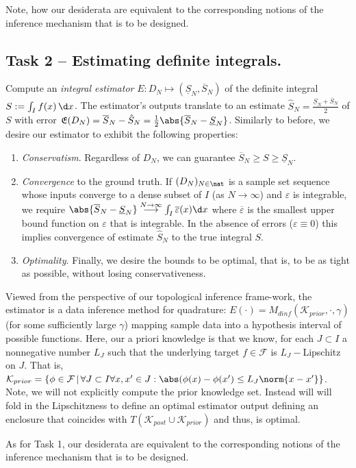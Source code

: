 Note, how our desiderata are equivalent to the corresponding notions of the inference mechanism that is to be designed.

\subsection{Task 2 -- Estimating definite integrals.}
	\label{sec:problemdef_task2}
 Compute an \textit{integral estimator} $E: D_N \mapsto (\underline S_N, \overline S_N)$ of the definite integral $S := \int_I f(x) \, \d x$. The estimator's outputs translate to an estimate $\hat S_N = \frac{\underline S_N+ \overline S_N}{2}$ of $S$ with error $\mathfrak E(D_N) =\overline S_N - \hat S_N = \frac{1}{2} \abs{\overline S_N - \underline S_N}$. Similarly to before, we desire our estimator to exhibit the following properties:
\begin{enumerate}
			\item \textit{Conservatism}.  Regardless of $D_N$, we can guarantee $\overline S_N \geq S \geq \underline S_N$. 
			
			\item \textit{Convergence} to the ground truth. If $(D_N)_{N \in \nat }$ is a sample set sequence whose inputs converge to a dense subset of $I$ (as $N \to \infty$) and $\varepsilon$ is integrable, we require $\abs{\overline S_N - \underline S_N} \stackrel{N \to \infty} \longrightarrow \int_I  \overline \varepsilon(x) \d x$ where $\overline \varepsilon$ is the smallest upper bound function on $\varepsilon$ that is integrable. In the absence of errors ($\varepsilon \equiv 0$) this implies convergence of estimate $\hat S_N$ to the true integral $S$.
			\item \textit{Optimality}. Finally, we desire the bounds to be optimal, that is, to be as tight as possible, without losing conservativeness.
\end{enumerate}

Viewed from the perspective of our topological inference frame-work, the estimator is a data inference method for quadrature:
$E(\cdot) = M_{dinf}(\mathcal K_{prior}, \cdot, \gamma ) $ (for some sufficiently large $\gamma$) mapping sample data into a hypothesis interval of possible functions. 
Here,  our a priori knowledge is that we know, for each $J \subset I$ a nonnegative number $L_J$ such that the underlying target $f \in \mathcal F$ is $L_J-$Lipschitz on $J$. That is, $\mathcal K_{prior} =\{\phi \in \mathcal F \,|\, \forall J \subset I \forall x,x' \in J: \abs(\phi(x) - \phi(x') \leq L_J \norm{x-x'}\}$. 
Note, we will not explicitly compute the prior knowledge set. Instead will will fold in the Lipschitzness to define an optimal estimator output defining an enclosure that coincides with $ T (\mathcal K_{post} \cup \mathcal K_{prior})$ and thus, is optimal.

As for Task 1, our desiderata are equivalent to the corresponding notions of the inference mechanism that is to be designed.

